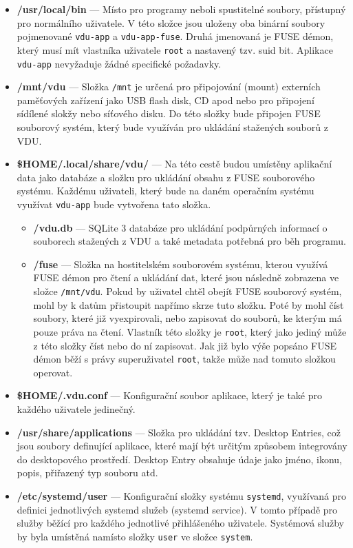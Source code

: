 \begin{itemize}
    \item \textbf{/usr/local/bin} — Místo pro programy neboli spustitelné soubory, přístupný pro normálního uživatele. V této složce jsou uloženy oba binární
    soubory pojmenované \texttt{vdu-app} a \texttt{vdu-app-fuse}. Druhá jmenovaná je FUSE démon, který musí mít vlastníka uživatele \texttt{root} a nastavený
    tzv. suid bit. Aplikace \texttt{vdu-app} nevyžaduje žádné specifické požadavky.
    \item \textbf{/mnt/vdu} — Složka \texttt{/mnt} je určená pro připojování (mount) externích paměťových zařízení jako USB flash disk, CD apod nebo pro připojení
    sídílené slokžy nebo síťového disku. Do této složky bude připojen FUSE souborový systém, který bude využíván pro ukládání stažených souborů z VDU.
    \item \textbf{\$HOME/.local/share/vdu/} — Na této cestě budou umístěny aplikační data jako databáze a složku pro ukládání obsahu z FUSE souborového systému.
    Každému uživateli, který bude na daném operačním systému využívat \texttt{vdu-app} bude vytvořena tato složka.
    \begin{itemize}
        \item \textbf{/vdu.db} — SQLite 3 databáze pro ukládání podpůrných informací o souborech stažených z VDU a také metadata potřebná pro běh programu.
        \item \textbf{/fuse} — Složka na hostitelském souborovém systému, kterou využívá FUSE démon pro čtení a ukládání dat, které jsou následně zobrazena
        ve složce \texttt{/mnt/vdu}. Pokud by uživatel chtěl obejít FUSE souborový systém, mohl by k datům přistoupit napřímo skrze tuto složku. Poté by mohl
        číst soubory, které již vyexpirovali, nebo zapisovat do souborů, ke kterým má pouze práva na čtení. Vlastník této složky je \texttt{root}, který jako
        jediný může z této složky číst nebo do ní zapisovat. Jak již bylo výše popsáno FUSE démon běží s právy superuživatel \texttt{root}, takže může nad tomuto
        složkou operovat.
    \end{itemize}
    \item \textbf{\$HOME/.vdu.conf} — Konfigurační soubor aplikace, který je také pro každého uživatele jedinečný.
    \item \textbf{/usr/share/applications} — Složka pro ukládání tzv. Desktop Entries, což jsou soubory definující aplikace, které mají být určitým způsobem integrovány
    do desktopového prostředí. Desktop Entry obsahuje údaje jako jméno, ikonu, popis, přiřazený typ souboru atd.
    \item \textbf{/etc/systemd/user} — Konfigurační složky systému \texttt{systemd}, využívaná pro definici jednotlivých systemd služeb (systemd service). V tomto 
    případě pro služby běžící pro každého jednotlivé přihlášeného uživatele. Systémová služby by byla umístěná namísto složky \texttt{user} ve složce \texttt{system}.
\end{itemize}

